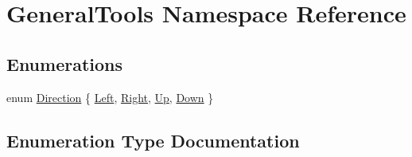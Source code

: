 \hypertarget{namespace_general_tools}{}\section{General\+Tools Namespace Reference}
\label{namespace_general_tools}
\subsection*{Enumerations}
\begin{DoxyCompactItemize}
\item 
enum \hyperlink{namespace_general_tools_afedc3bd242369903830dec92c3ad569b}{Direction} \{ \hyperlink{namespace_general_tools_afedc3bd242369903830dec92c3ad569bab00acd9fb7b617ebfd46e4677100efed}{Left}, 
\hyperlink{namespace_general_tools_afedc3bd242369903830dec92c3ad569ba7775452bf315556da946fb19953566c6}{Right}, 
\hyperlink{namespace_general_tools_afedc3bd242369903830dec92c3ad569ba256487529104fc4bc5264d0ad0943cf1}{Up}, 
\hyperlink{namespace_general_tools_afedc3bd242369903830dec92c3ad569ba3a5a85a78f3258b606af0ce840a0b71e}{Down}
 \}
\end{DoxyCompactItemize}


\subsection{Enumeration Type Documentation}
\hypertarget{namespace_general_tools_afedc3bd242369903830dec92c3ad569b}{}
